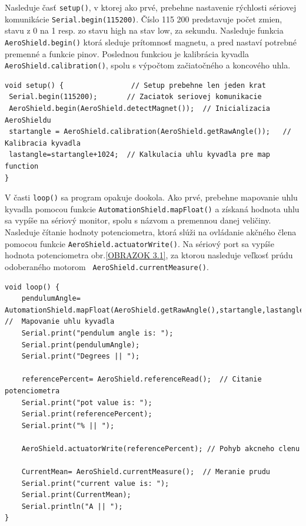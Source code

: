 Nasleduje časť \verb|setup()|, v ktorej ako prvé, prebehne nastavenie rýchlosti sériovej komunikácie \verb|Serial.begin(115200)|. Číslo 115 200 predstavuje počet zmien, stavu z 0 na 1 resp. zo stavu high na stav low, za sekundu. Nasleduje funkcia \verb|AeroShield.begin()| ktorá sleduje prítomnosť magnetu, a pred nastaví potrebné premenné a funkcie pinov. Poslednou funkciou je kalibrácia kyvadla \verb|AeroShield.calibration()|, spolu s výpočtom začiatočného a koncového uhla. 

\begin{lstlisting}[caption={AeroShield open loop setup().},captionpos=b]
void setup() {                // Setup prebehne len jeden krat 
 Serial.begin(115200);       // Zaciatok seriovej komunikacie 
 AeroShield.begin(AeroShield.detectMagnet());  // Inicializacia AeroShieldu 
 startangle = AeroShield.calibration(AeroShield.getRawAngle());   // Kalibracia kyvadla
 lastangle=startangle+1024;  // Kalkulacia uhlu kyvadla pre map function
}
\end{lstlisting}

V časti \verb|loop()| sa program opakuje dookola. Ako prvé, prebehne mapovanie uhlu kyvadla pomocou funkcie \verb|AutomationShield.mapFloat()| a získaná hodnota uhlu sa vypíše na sériový monitor, spolu s názvom a premennou danej veličiny. Nasleduje čítanie hodnoty potenciometra, ktorá slúži na ovládanie akčného člena pomocou funkcie \verb|AeroShield.actuatorWrite()|. Na sériový port sa vypíše hodnota potenciometra obr.\ref{OBRAZOK 3.1}, za ktorou nasleduje veľkosť prúdu odoberaného motorom \verb| AeroShield.currentMeasure()|. 

\begin{lstlisting}[caption={AeroShield open loop loop().},captionpos=b]
void loop() {
	pendulumAngle= AutomationShield.mapFloat(AeroShield.getRawAngle(),startangle,lastangle,0.00,90.00);    //  Mapovanie uhlu kyvadla 
	Serial.print("pendulum angle is: ");
	Serial.print(pendulumAngle);    
	Serial.print("Degrees || ");
	
	referencePercent= AeroShield.referenceRead();  // Citanie potenciometra
	Serial.print("pot value is: ");
	Serial.print(referencePercent);  
	Serial.print("% || ");
	
	AeroShield.actuatorWrite(referencePercent); // Pohyb akcneho clenu
	
	CurrentMean= AeroShield.currentMeasure();  // Meranie prudu
	Serial.print("current value is: ");
	Serial.print(CurrentMean);   
	Serial.println("A || ");
}
\end{lstlisting}


